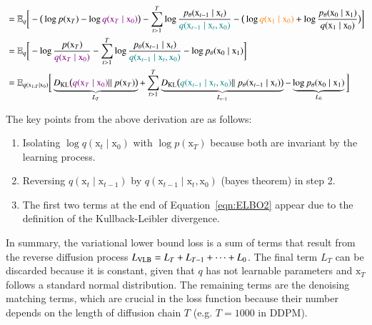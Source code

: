\begin{equation}
\begin{split}
        & = \mathbb{E}_{q}\bigg[-\big(\log p(\mathrm{x}_{T}) - \log \textcolor{violet}{q(\mathrm{x}_{T}\mid\mathrm{x}_{0})}\big) - \sum_{t>1}^{T} \log \frac{p_{\theta}(\mathrm{x}_{t-1}\mid\mathrm{x}_{t})}{\textcolor{teal}{q(\mathrm{x}_{t-1}\mid\mathrm{x}_{t}, \mathrm{x}_{0})}} - \big( \log\textcolor{orange}{q(\mathrm{x}_{1}\mid\mathrm{x}_{0})}  +\log\frac{p_{\theta}(\mathrm{x}_{0}\mid\mathrm{x}_{1})}{q(\mathrm{x}_{1}\mid\mathrm{x}_{0})}\big)\bigg]  \\ 
        & = \mathbb{E}_{q}\bigg[-\log \frac{p(\mathrm{x}_{T})}{\textcolor{violet}{q(\mathrm{x}_{T}\mid\mathrm{x}_{0})}} - \sum_{t>1}^{T} \log \frac{p_{\theta}(\mathrm{x}_{t-1}\mid\mathrm{x}_{t})}{\textcolor{teal}{q(\mathrm{x}_{t-1}\mid\mathrm{x}_{t}, \mathrm{x}_{0})}} -  \log p_{\theta}(\mathrm{x}_{0}\mid\mathrm{x}_{1})\bigg]  \\
        & = \mathbb{E}_{q(\mathrm{x}_{1:T}\mid\mathrm{x}_{0})}\bigg[\underbrace{D_{\text{\scriptsize{KL}}}\big(\textcolor{violet}{q(\mathrm{x}_{T}\mid\mathrm{x}_{0})} ||~p(\mathrm{x}_{T}) \big)}_{L_{T}} + \sum_{t>1}^{T} \underbrace{D_{\text{\scriptsize{KL}}}\big( \textcolor{teal}{q(\mathrm{x}_{t-1}\mid\mathrm{x}_{t}, \mathrm{x}_{0})}||~p_{\theta}(\mathrm{x}_{t-1}\mid\mathrm{x}_{t}) \big)}_{L_{t-1}} -  \underbrace{\log p_{\theta}(\mathrm{x}_{0}\mid\mathrm{x}_{1})}_{L_{0}} \bigg]
    \end{split}
\end{equation}

\noindent The key points from the above derivation are as follows: 
\begin{enumerate}
    \item Isolating  $\log q(\mathrm{x}_{t}\mid\mathrm{x}_{0})$ with $\log p(\mathrm{x}_{T})$ because both are invariant by the learning process.
    \item Reversing $q(\mathrm{x}_{t}\mid\mathrm{x}_{t-1})$ by $q(\mathrm{x}_{t-1}\mid\mathrm{x}_{t}, \mathrm{x}_{0})$ (bayes theorem) in step 2. 
    \item The first two terms at the end of Equation~\ref{eqn:ELBO2} appear due to the definition of the Kullback-Leibler divergence. 
\end{enumerate}
    
\noindent In summary, the variational lower bound loss is a sum of terms that result from the reverse diffusion process $L_{\text{\scriptsize{\text{VLB}}}}=L_{T} + L_{T-1} + \dots + L_{0}$. The final term $L_{T}$ can be discarded because
it is constant, given that $q$ has not learnable parameters and $\mathrm{x}_{T}$ follows a standard normal distribution. The remaining terms are the denoising matching terms, which are crucial in the loss function because their number depends on the length of diffusion chain $T$ (e.g. $T=1000$ in DDPM).\\


